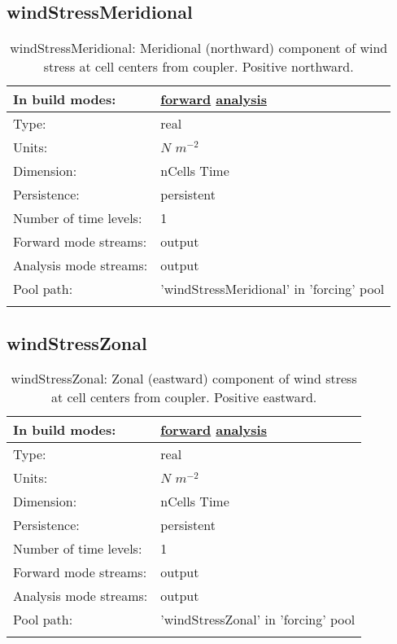 \subsection[windStressMeridional]{windStressMeridional}
\label{subsec:var_sec_forcing_windStressMeridional}
\begin{center}
\begin{longtable}{| p{2.0in} | p{4.0in} |}
        \hline 
        In build modes: & \hyperref[subsec:forward_var_tab_forcing]{forward} \hyperref[subsec:analysis_var_tab_forcing]{analysis} \\
        \hline 
        Type: & real \\
        \hline 
        Units: & $N$ $m^{-2}$ \\
        \hline 
        Dimension: & nCells Time \\
        \hline 
        Persistence: & persistent \\
        \hline 
        Number of time levels: & 1 \\
        \hline 
		 Forward mode streams: &  output \\
        \hline 
		 Analysis mode streams: &  output \\
        \hline 
            Pool path: & 'windStressMeridional' in 'forcing' pool
 \\
		 \hline 
    \caption{windStressMeridional: Meridional (northward) component of wind stress at cell centers from coupler. Positive northward.}
\end{longtable}
\end{center}
\subsection[windStressZonal]{windStressZonal}
\label{subsec:var_sec_forcing_windStressZonal}
\begin{center}
\begin{longtable}{| p{2.0in} | p{4.0in} |}
        \hline 
        In build modes: & \hyperref[subsec:forward_var_tab_forcing]{forward} \hyperref[subsec:analysis_var_tab_forcing]{analysis} \\
        \hline 
        Type: & real \\
        \hline 
        Units: & $N$ $m^{-2}$ \\
        \hline 
        Dimension: & nCells Time \\
        \hline 
        Persistence: & persistent \\
        \hline 
        Number of time levels: & 1 \\
        \hline 
		 Forward mode streams: &  output \\
        \hline 
		 Analysis mode streams: &  output \\
        \hline 
            Pool path: & 'windStressZonal' in 'forcing' pool
 \\
		 \hline 
    \caption{windStressZonal: Zonal (eastward) component of wind stress at cell centers from coupler. Positive eastward.}
\end{longtable}
\end{center}
